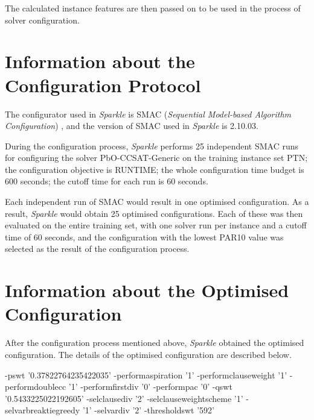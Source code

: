 \documentclass[british]{article}
\newif\iffeatures
\begin{document}
        The calculated instance features are then passed on to be used in the process of solver configuration. 

\fi


\section{Information about the Configuration Protocol}

The configurator used in \emph{Sparkle} is SMAC ({\em Sequential Model-based Algorithm Configuration}) \cite{HutEtAl11}, and the version of SMAC used in \emph{Sparkle} is 2.10.03.

During the configuration process, \emph{Sparkle} performs 25 independent SMAC runs for configuring the solver PbO-CCSAT-Generic on the training instance set PTN\iffeatures; the instance features of the training instance set were used for configuration\fi; the configuration objective is RUNTIME; the whole configuration time budget is 600 seconds; the cutoff time for each run is 60 seconds.

Each independent run of SMAC would result in one optimised configuration. As a result, \emph{Sparkle} would obtain 25 optimised configurations. Each of these was then evaluated on the entire training set, with one solver run per instance and a cutoff time of 60 seconds, and the configuration with the lowest PAR10 value was selected as the result of the configuration process.

\section{Information about the Optimised Configuration}

After the configuration process mentioned above, \emph{Sparkle} obtained the optimised configuration. The details of the optimised configuration are described below.

\vspace{5mm}

-p\textunderscore swt '0.37822764235422035' -perform\textunderscore aspiration '1' -perform\textunderscore clause\textunderscore weight '1' -perform\textunderscore double\textunderscore cc '1' -perform\textunderscore first\textunderscore div '0' -perform\textunderscore pac '0' -q\textunderscore swt '0.5433225022192605' -sel\textunderscore clause\textunderscore div '2' -sel\textunderscore clause\textunderscore weight\textunderscore scheme '1' -sel\textunderscore var\textunderscore break\textunderscore tie\textunderscore greedy '1' -sel\textunderscore var\textunderscore div '2' -threshold\textunderscore swt '592'
\end{document}
